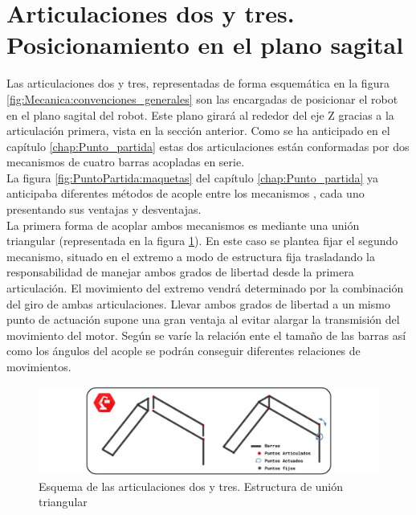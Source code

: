\section{Articulaciones dos y tres. Posicionamiento en el plano sagital} \label{sec:Mecanica:articulacion_dostres}

    Las articulaciones dos y tres, representadas de forma esquemática en la figura \ref{fig:Mecanica:convenciones_generales} son las encargadas de posicionar el robot en el plano sagital del robot. Este plano girará al rededor del eje Z gracias a la articulación primera, vista en la sección anterior. Como se ha anticipado en el capítulo \ref{chap:Punto_partida} estas dos articulaciones están conformadas por dos mecanismos de cuatro barras acopladas en serie.
    \\

    La figura \ref{fig:PuntoPartida:maquetas} del capítulo \ref{chap:Punto_partida} ya anticipaba diferentes métodos de acople entre los mecanismos , cada uno presentando sus ventajas y desventajas.
    \\

	La primera forma de acoplar ambos mecanismos es mediante una unión triangular (representada en la figura \ref{fig:Mecanica:4_bar_mecanism_triangle}). En este caso se plantea fijar el segundo mecanismo, situado en el extremo a modo de estructura fija trasladando la responsabilidad de manejar ambos grados de libertad desde la primera articulación. El movimiento del extremo vendrá determinado por la combinación del giro de ambas articulaciones. Llevar ambos grados de libertad a un mismo punto de actuación supone una gran ventaja al evitar alargar la transmisión del movimiento del motor. Según se varíe la relación ente el tamaño de las barras así como los ángulos del acople se podrán conseguir diferentes relaciones de movimientos.
	
	\begin{figure}[H]
		\centering       	
		\includegraphics[width=\textwidth]{figuras/Imagenes_Mecanica/mecanismos_4_barras_triangulo.jpg}
		\caption{Esquema de las articulaciones dos y tres. Estructura de unión triangular}
		\label{fig:Mecanica:4_bar_mecanism_triangle}
	\end{figure}
	

